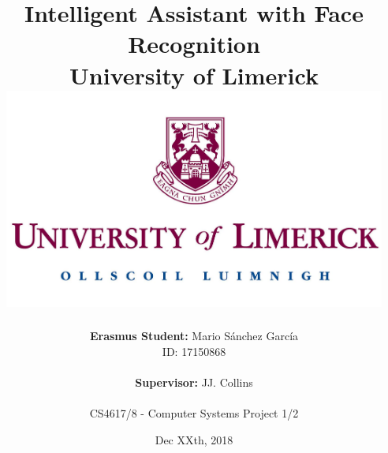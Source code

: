 \documentclass[a4paper,12pt,fleqn]{report}
\title{
	{Intelligent Assistant with Face Recognition}\\
	{\large University of Limerick}\\
	{\includegraphics[max width=126mm]{university.jpg}}
	\vspace{0.8cm}
}
\author{
	\textbf{Erasmus Student:} Mario Sánchez García\\
	ID: 17150868\\
	\\
	\textbf{Supervisor:} JJ. Collins\\
	\\
	CS4617/8 - Computer Systems Project 1/2
}
\date{Dec XXth, 2018}
\def \chapterspath {./chapters}
\begin{document}
\maketitle
\vfill



%
%
\tableofcontents

%
%

%
%





%


  
\end{document}
